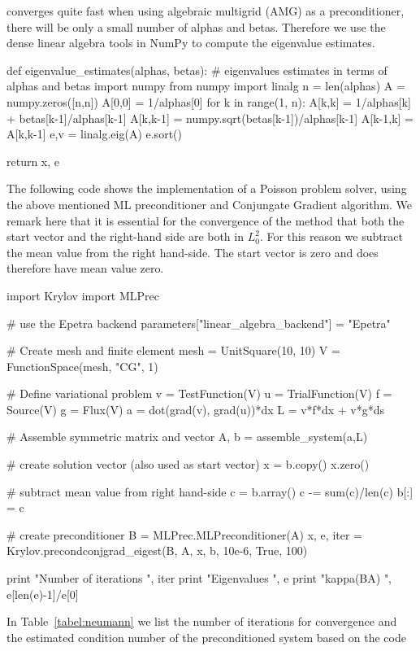converges quite fast when using algebraic multigrid (AMG) as a preconditioner, there will be only a small
number of alphas and betas. Therefore we use the dense linear algebra tools in 
NumPy to compute the eigenvalue estimates. 
\begin{python}
def eigenvalue_estimates(alphas, betas):
    # eigenvalues estimates in terms of alphas and betas
    import numpy
    from numpy import linalg
    n = len(alphas)
    A = numpy.zeros([n,n])
    A[0,0] = 1/alphas[0]
    for k in range(1, n): 
        A[k,k] = 1/alphas[k] + betas[k-1]/alphas[k-1]
        A[k,k-1] = numpy.sqrt(betas[k-1])/alphas[k-1]
        A[k-1,k] = A[k,k-1]
    e,v = linalg.eig(A) 
    e.sort()

    return x, e
\end{python}
The following code shows the implementation of a Poisson problem solver, using the
above mentioned ML preconditioner and Conjungate Gradient algorithm. We remark here that it
is essential for the convergence of the method that both the start vector 
and the right-hand side are both in $L^2_0$. For this reason we subtract the 
mean value from the right hand-side.  The start vector is zero and does therefore
have mean value zero. 
\begin{python}
import Krylov 
import MLPrec 

# use the Epetra backend
parameters["linear_algebra_backend"] = "Epetra"

# Create mesh and finite element
mesh = UnitSquare(10, 10)
V = FunctionSpace(mesh, "CG", 1)

# Define variational problem
v = TestFunction(V)
u = TrialFunction(V)
f = Source(V)
g = Flux(V)
a = dot(grad(v), grad(u))*dx
L = v*f*dx + v*g*ds

# Assemble symmetric matrix and vector
A, b = assemble_system(a,L)

# create solution vector (also used as start vector) 
x = b.copy()
x.zero()

# subtract mean value from right hand-side
c = b.array()
c -= sum(c)/len(c)
b[:] = c  

# create preconditioner
B = MLPrec.MLPreconditioner(A)
x, e, iter = Krylov.precondconjgrad_eigest(B, A, x, b, 10e-6, True, 100)

print "Number of iterations ", iter
print "Eigenvalues ", e 
print "kappa(BA) ", e[len(e)-1]/e[0]
\end{python}
In Table~\ref{tabel:neumann} we list the number of iterations for convergence and
the estimated condition number of the preconditioned system based on the code 
